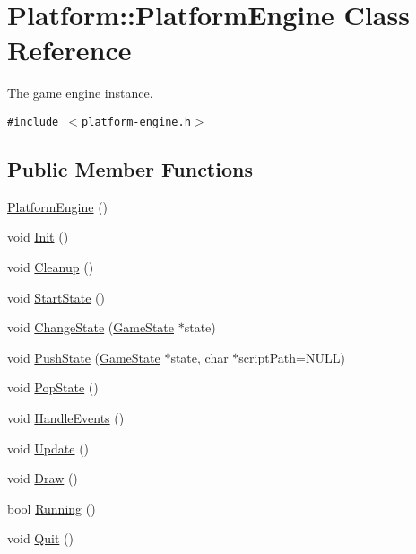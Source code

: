 \hypertarget{class_platform_1_1_platform_engine}{
\section{Platform::PlatformEngine Class Reference}
\label{d2/dd5/class_platform_1_1_platform_engine}
}
The game engine instance.  


{\tt \#include $<$platform-engine.h$>$}

\subsection*{Public Member Functions}
\begin{CompactItemize}
\item 
\hyperlink{class_platform_1_1_platform_engine_dbbbe20e4646a36123681e4c69f621f2}{PlatformEngine} ()
\item 
void \hyperlink{class_platform_1_1_platform_engine_8745a9f24dcbb112506321f2ae8bb79b}{Init} ()
\item 
void \hyperlink{class_platform_1_1_platform_engine_71ec02a1e29f8fe078bc458627ff0f4c}{Cleanup} ()
\item 
void \hyperlink{class_platform_1_1_platform_engine_7ec18621f367de9dd678a2d48a139a40}{StartState} ()
\item 
void \hyperlink{class_platform_1_1_platform_engine_23a7914b737c272ce1a46fc1ae1decbb}{ChangeState} (\hyperlink{class_platform_1_1_game_state}{GameState} $\ast$state)
\item 
void \hyperlink{class_platform_1_1_platform_engine_e9bbdbfed8a9d99bc89f21cee4b15bfd}{PushState} (\hyperlink{class_platform_1_1_game_state}{GameState} $\ast$state, char $\ast$scriptPath=NULL)
\item 
void \hyperlink{class_platform_1_1_platform_engine_3b2f23576d40b0a97f8f6477d5156bdf}{PopState} ()
\item 
void \hyperlink{class_platform_1_1_platform_engine_ced86dc9266db718d80eec4a61f26c7d}{HandleEvents} ()
\item 
void \hyperlink{class_platform_1_1_platform_engine_7f4d1cf999344461cd15dda4106a9e20}{Update} ()
\item 
void \hyperlink{class_platform_1_1_platform_engine_af99d3e57733259edd6ffd727c9141e7}{Draw} ()
\item 
bool \hyperlink{class_platform_1_1_platform_engine_a89b32e154a653388cc42f5b9a582f59}{Running} ()
\item 
void \hyperlink{class_platform_1_1_platform_engine_e65f082e457e8d7dab762f7ab6b6d82b}{Quit} ()
\end{CompactItemize}


